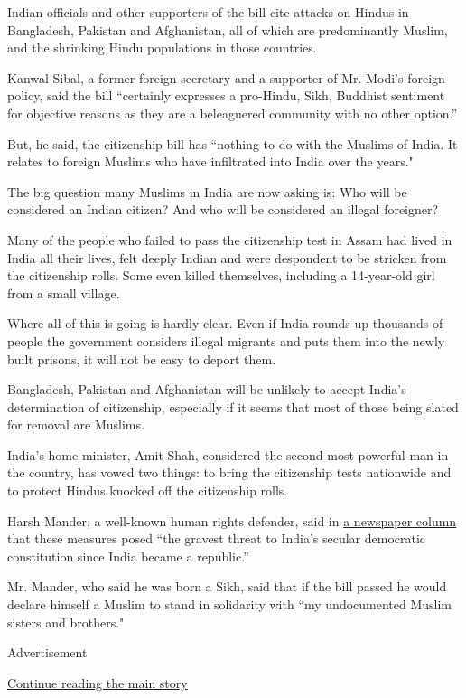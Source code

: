 Indian officials and other supporters of the bill cite attacks on Hindus
in Bangladesh, Pakistan and Afghanistan, all of which are predominantly
Muslim, and the shrinking Hindu populations in those countries.

Kanwal Sibal, a former foreign secretary and a supporter of Mr. Modi's
foreign policy, said the bill ``certainly expresses a pro-Hindu, Sikh,
Buddhist sentiment for objective reasons as they are a beleaguered
community with no other option.''

But, he said, the citizenship bill has ``nothing to do with the Muslims
of India. It relates to foreign Muslims who have infiltrated into India
over the years."

The big question many Muslims in India are now asking is: Who will be
considered an Indian citizen? And who will be considered an illegal
foreigner?

Many of the people who failed to pass the citizenship test in Assam had
lived in India all their lives, felt deeply Indian and were despondent
to be stricken from the citizenship rolls. Some even killed themselves,
including a 14-year-old girl from a small village.

Where all of this is going is hardly clear. Even if India rounds up
thousands of people the government considers illegal migrants and puts
them into the newly built prisons, it will not be easy to deport them.

Bangladesh, Pakistan and Afghanistan will be unlikely to accept India's
determination of citizenship, especially if it seems that most of those
being slated for removal are Muslims.

India's home minister, Amit Shah, considered the second most powerful
man in the country, has vowed two things: to bring the citizenship tests
nationwide and to protect Hindus knocked off the citizenship rolls.

Harsh Mander, a well-known human rights defender, said in
\href{https://indianexpress.com/article/opinion/columns/this-land-is-mine-citizenship-amendment-bill-6160570/}{a
newspaper column} that these measures posed ``the gravest threat to
India's secular democratic constitution since India became a republic.''

Mr. Mander, who said he was born a Sikh, said that if the bill passed he
would declare himself a Muslim to stand in solidarity with ``my
undocumented Muslim sisters and brothers."

Advertisement

\protect\hyperlink{after-bottom}{Continue reading the main story}

